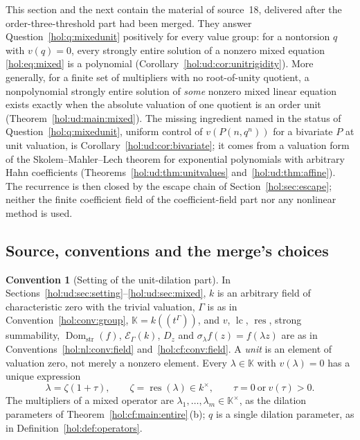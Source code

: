 \documentclass[11pt]{article}
\numberwithin{equation}{section}
\theoremstyle{definition}
\newtheorem{convention}[theorem]{Convention}
\theoremstyle{remark}
\newcommand{\lc}{\operatorname{lc}}
\newcommand{\res}{\operatorname{res}}
\newcommand{\Dom}{\operatorname{Dom}_{\mathrm{str}}}
\newcommand{\KK}{\mathbb K}
\newcommand{\EK}{\mathcal E_\Gamma(k)}
\begin{document}
This section and the next contain the material of source~18, delivered after
the order-three-threshold part had been merged. They answer
Question~\ref{hol:q:mixedunit} positively for every value group: for a
nontorsion $q$ with $v(q)=0$, every strongly entire solution of a nonzero
mixed equation \eqref{hol:eq:mixed} is a polynomial
(Corollary~\ref{hol:ud:cor:unitrigidity}). More generally, for a finite set of
multipliers with no root-of-unity quotient, a nonpolynomial strongly entire
solution of \emph{some} nonzero mixed linear equation exists exactly when the
absolute valuation of one quotient is an order unit
(Theorem~\ref{hol:ud:main:mixed}). The missing ingredient named in the status
of Question~\ref{hol:q:mixedunit}, uniform control of $v(P(n,q^n))$ for a
bivariate $P$ at unit valuation, is Corollary~\ref{hol:ud:cor:bivariate}; it
comes from a valuation form of the Skolem--Mahler--Lech theorem for
exponential polynomials with arbitrary Hahn coefficients
(Theorems~\ref{hol:ud:thm:unitvalues} and~\ref{hol:ud:thm:affine}). The
recurrence is then closed by the escape chain of
Section~\ref{hol:sec:escape}; neither the finite coefficient field of the
coefficient-field part nor any nonlinear method is used.

\subsection{Source, conventions and the merge's choices}
\label{hol:ud:sub:conventions}

\begin{convention}[Setting of the unit-dilation part]
\label{hol:ud:conv:field}
In Sections~\ref{hol:ud:sec:setting}--\ref{hol:ud:sec:mixed}, $k$ is an
arbitrary field of characteristic zero with the trivial valuation, $\Gamma$ is
as in Convention~\ref{hol:conv:group}, $\KK=k((t^\Gamma))$, and $v$, $\lc$,
$\res$, strong summability, $\Dom(f)$, $\EK$, $D_z$ and $\sigma_\lambda f(z)=
f(\lambda z)$ are as in Conventions~\ref{hol:nl:conv:field}
and~\ref{hol:cf:conv:field}. A \emph{unit} is an element of valuation zero,
not merely a nonzero element. Every $\lambda\in\KK$ with $v(\lambda)=0$ has a
unique expression
\begin{equation}\label{hol:ud:eq:unitdecomp}
 \lambda=\zeta(1+\tau),\qquad \zeta=\res(\lambda)\in k^\times,\qquad
 \tau=0\ \text{or}\ v(\tau)>0 .
\end{equation}
The multipliers of a mixed operator are $\lambda_1,\ldots,\lambda_m\in\KK^\times$,
as the dilation parameters of Theorem~\ref{hol:cf:main:entire}\,(b); $q$ is a
single dilation parameter, as in Definition~\ref{hol:def:operators}.
\end{convention}
\end{document}
